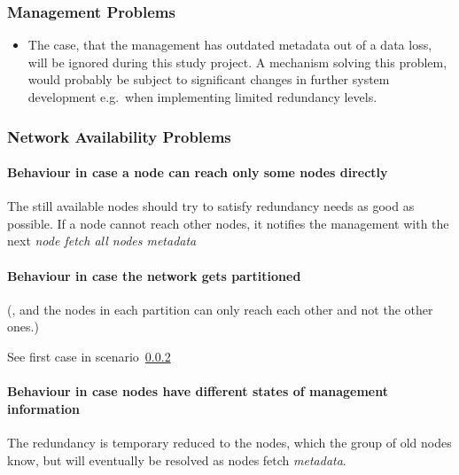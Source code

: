 \subsubsection{Management Problems}\label{sec:scenario-management-problems}
\begin{itemize}
    \item The case, that the management has outdated metadata out of a data loss, will be ignored during this study project. A mechanism solving this problem, would probably be subject to significant changes in further system development e.g.\ when implementing limited redundancy levels. %
\end{itemize}

\subsubsection{Network Availability Problems}\label{sec:scenario-network-errors}
\paragraph{Behaviour in case a node can reach only some nodes directly}
The still available nodes should try to satisfy redundancy needs as good as possible.
If a node cannot reach other nodes, it notifies the management with the next \emph{node fetch all nodes metadata}

\paragraph{Behaviour in case the network gets partitioned}
(, and the nodes in each partition can only reach each other and not the other ones.)

See first case in scenario~\ref{sec:scenario-network-errors}

\paragraph{Behaviour in case nodes have different states of management information}
The redundancy is temporary reduced to the nodes, which the group of old nodes know, but will eventually be resolved as nodes fetch \emph{metadata}. %